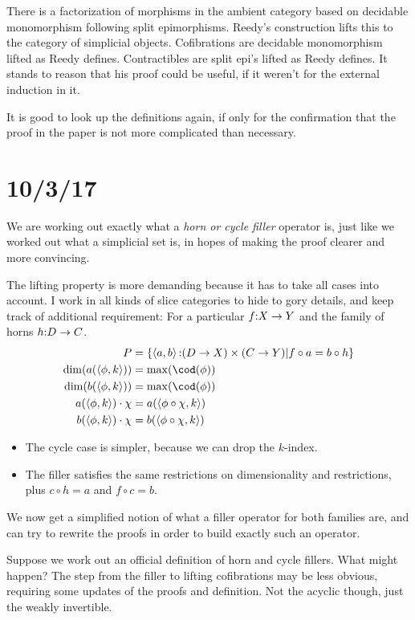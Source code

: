 \documentclass[csh.tex]{subfiles}
\begin{document}
There is a factorization of morphisms in the ambient category based on decidable monomorphism following split epimorphisms.
Reedy's construction lifts this to the category of simplicial objects.
Cofibrations are decidable monomorphism lifted as Reedy defines.
Contractibles are split epi's lifted as Reedy defines.
It stands to reason that his proof could be useful, if it weren't for the external induction in it.

It is good to look up the definitions again, if only for the confirmation that the proof in the paper is not more complicated than necessary.

\section{10/3/17}
We are working out exactly what a \emph{horn or cycle filler} operator is, just like we worked out what a simplicial set is, in hopes of making the proof clearer and more convincing.

The lifting property is more demanding because it has to take all cases into account.
I work in all kinds of slice categories to hide to gory details, and keep track of additional requirement:
For a particular $f\mathord : X\to Y$ and the family of horns $h\mathord : D\to C$.
\begin{align*}
P &= \set{ \tuplet{a,b}\of(D\to X)\times(C\to Y)| f\circ a = b \circ h }\\
\dim(a(\tuplet{\phi,k})) &=\max(\cod(\phi))\\
\dim(b(\tuplet{\phi,k})) &= \max(\cod(\phi))\\
a(\tuplet{\phi,k})\cdot\chi &= a(\tuplet{\phi\circ \chi,k}) \\
b(\tuplet{\phi,k})\cdot\chi &= b(\tuplet{\phi\circ \chi,k}) \\
\end{align*}
\begin{itemize}
\item The cycle case is simpler, because we can drop the $k$-index.
\item The filler satisfies the same restrictions on dimensionality and restrictions, plus $c\circ h = a$ and $f\circ c = b$.
\end{itemize}

We now get a simplified notion of what a filler operator for both families are, and can try to rewrite the proofs in order to build exactly such an operator.

Suppose we work out an official definition of horn and cycle fillers. What might happen?
The step from the filler to lifting cofibrations may be less obvious, requiring some updates of the proofs and definition.
Not the acyclic though, just the weakly invertible.
\end{document}
